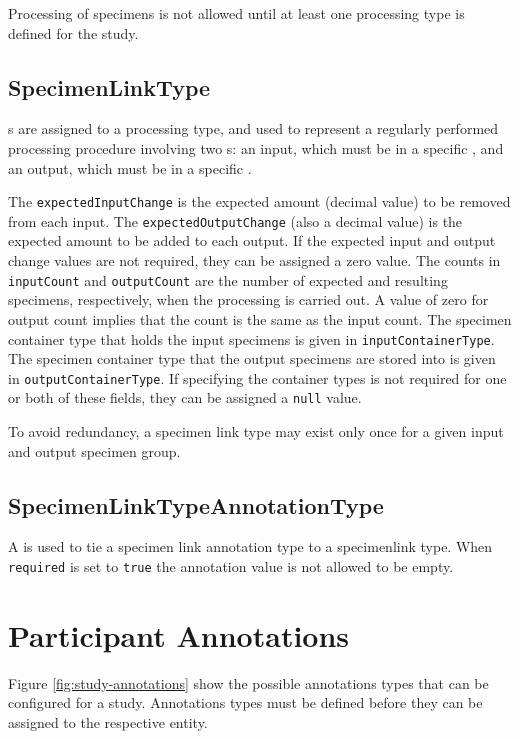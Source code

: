 Processing of specimens is not allowed until at least one processing type is
defined for the study.

\subsection*{SpecimenLinkType}

 s are assigned to
a processing type, and used to represent a regularly performed processing
procedure involving two s: an input, which must be in a
specific , and an output, which must be in a specific
.

The \texttt{expectedInputChange} is the expected amount (decimal value) to be
removed from each input. The \texttt{expectedOutputChange} (also a decimal
value) is the expected amount to be added to each output. If the expected input
and output change values are not required, they can be assigned a zero value.
The counts in \texttt{inputCount} and \texttt{outputCount} are the number of
expected and resulting specimens, respectively, when the processing is carried
out. A value of zero for output count implies that the count is the same as the
input count. The specimen container type that holds the input specimens is
given in \texttt{inputContainerType}. The specimen container type that the
output specimens are stored into is given in \texttt{outputContainerType}. If
specifying the container types is not required for one or both of these fields,
they can be assigned a \texttt{null} value.

To avoid redundancy, a specimen link type may exist only once for a given input
and output specimen group.

\subsection*{SpecimenLinkTypeAnnotationType}

A  is used to tie a specimen
link annotation type to a specimenlink type. When \texttt{required} is set to
\texttt{true} the annotation value is not allowed to be empty.

\section{Participant Annotations}
\label{sec:participant-annotations}

Figure \ref{fig:study-annotations} show the possible annotations types that can
be configured for a study. Annotations types must be defined before they can be
assigned to the respective entity.

